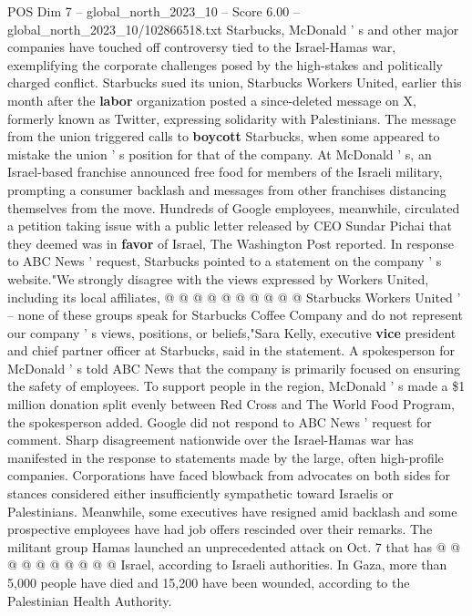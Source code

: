 \begin{textsample}{POS Dim 7 – global\_north\_2023\_10 – Score 6.00 – global\_north\_2023\_10/102866518.txt}  \label{ex:f7_pos_254}
Starbucks, McDonald ' s and other major companies have touched off controversy tied to the Israel-Hamas war, exemplifying the corporate challenges posed by the high-stakes and politically charged conflict.
Starbucks sued its union, Starbucks Workers United, earlier this month after the \textbf{labor} organization posted a since-deleted message on X, formerly known as Twitter, expressing solidarity with Palestinians.
The message from the union triggered calls to \textbf{boycott} Starbucks, when some appeared to mistake the union ' s position for that of the company.
At McDonald ' s, an Israel-based franchise announced free food for members of the Israeli military, prompting a consumer backlash and messages from other franchises distancing themselves from the move.
Hundreds of Google employees, meanwhile, circulated a petition taking issue with a public letter released by CEO Sundar Pichai that they deemed was in \textbf{favor} of Israel, The Washington Post reported.
In response to ABC News ' request, Starbucks pointed to a statement on the company ' s website."We strongly disagree with the views expressed by Workers United, including its local affiliates, @ @ @ @ @ @ @ @ @ @ Starbucks Workers United ' -- none of these groups speak for Starbucks Coffee Company and do not represent our company ' s views, positions, or beliefs,"Sara Kelly, executive \textbf{vice} president and chief partner officer at Starbucks, said in the statement.
A spokesperson for McDonald ' s told ABC News that the company is primarily focused on ensuring the safety of employees.
To support people in the region, McDonald ' s made a \$1 million donation split evenly between Red Cross and The World Food Program, the spokesperson added.
Google did not respond to ABC News ' request for comment.
Sharp disagreement nationwide over the Israel-Hamas war has manifested in the response to statements made by the large, often high-profile companies.
Corporations have faced blowback from advocates on both sides for stances considered either insufficiently sympathetic toward Israelis or Palestinians.
Meanwhile, some executives have resigned amid backlash and some prospective employees have had job offers rescinded over their remarks.
The militant group Hamas launched an unprecedented attack on Oct. 7 that has @ @ @ @ @ @ @ @ @ @ Israel, according to Israeli authorities.
In Gaza, more than 5,000 people have died and 15,200 have been wounded, according to the Palestinian Health Authority.

\end{textsample}
